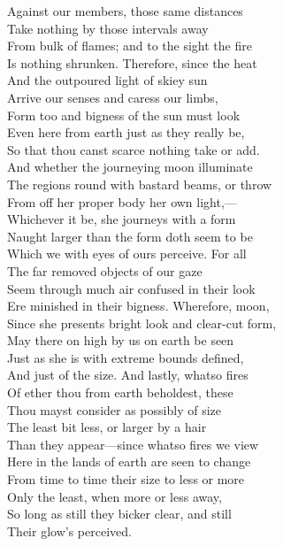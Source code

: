 Against our members, those same distances\\
Take nothing by those intervals away\\
From bulk of flames; and to the sight the fire\\
Is nothing shrunken. Therefore, since the heat\\
And the outpoured light of skiey sun\\
Arrive our senses and caress our limbs,\\
Form too and bigness of the sun must look\\
Even here from earth just as they really be,\\
So that thou canst scarce nothing take or add.\\
And whether the journeying moon illuminate\\
The regions round with bastard beams, or throw\\
From off her proper body her own light,—\\
Whichever it be, she journeys with a form\\
Naught larger than the form doth seem to be\\
Which we with eyes of ours perceive. For all\\
The far removed objects of our gaze\\
Seem through much air confused in their look\\
Ere minished in their bigness. Wherefore, moon,\\
Since she presents bright look and clear-cut form,\\
May there on high by us on earth be seen\\
Just as she is with extreme bounds defined,\\
And just of the size. And lastly, whatso fires\\
Of ether thou from earth beholdest, these\\
Thou mayst consider as possibly of size\\
The least bit less, or larger by a hair\\
Than they appear—since whatso fires we view\\
Here in the lands of earth are seen to change\\
From time to time their size to less or more\\
Only the least, when more or less away,\\
So long as still they bicker clear, and still\\
Their glow's perceived.\\
